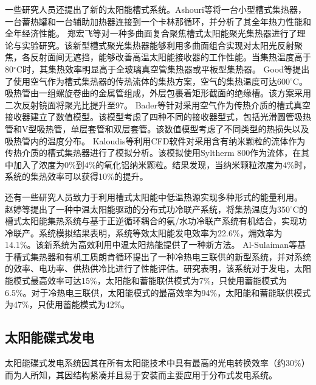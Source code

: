 一些研究人员还提出了新的太阳能槽式系统。Ashouri等\cite{Ashouri2015}将一台小型槽式集热器，一台蓄热罐和一台辅助加热器连接到一个卡林那循环，并分析了其全年热力性能和全年经济性能。
郑宏飞等\cite{Zheng2011}对一种多曲面复合聚焦槽式太阳能聚光集热器进行了理论与实验研究。该新型槽式聚光集热器能够利用多曲面组合实现对太阳光反射聚焦，各反射面间无遮挡，能够改善高温太阳能接收器的工作性能。当集热温度高于80$\mathrm{^\circ C}$时，其集热效率明显高于全玻璃真空管集热器或平板型集热器。
Good等\cite{Good2016}提出了使用空气作为槽式集热器的传热流体的集热方案，空气的集热温度可达600$\mathrm{^\circ C}$。吸热管由一组螺旋卷曲的金属管组成，外层包裹着矩形截面的绝缘槽。该方案采用二次反射镜面将聚光比提升至97。
Bader等\cite{Bader2015}针对采用空气作为传热介质的槽式真空接收器建立了数值模型。该模型考虑了四种不同的接收器型式，包括光滑圆管吸热管和V型吸热管，单层套管和双层套管。该数值模型考虑了不同类型的热损失以及吸热管内的温度分布。
Kaloudis等\cite{Kaloudis2016}利用CFD软件对采用含有纳米颗粒的流体作为传热介质的槽式集热器进行了模拟分析。该模拟使用Syltherm 800作为流体，在其中加入了浓度为0\%到4\%的氧化铝纳米颗粒。结果发现，当纳米颗粒浓度为4\%时，系统的集热效率可以获得10\%的提升。

还有一些研究人员致力于利用槽式太阳能中低温热源实现多种形式的能量利用。
赵婷等\cite{Zhao2013}提出了一种中温太阳能驱动的分布式功冷联产系统，将集热温度为350$\mathrm{^\circ C}$的槽式太阳能集热系统与基于正逆循环耦合的氨/水功冷联产系统有机结合，实现功冷联产。系统模拟结果表明，系统等效太阳能发电效率为22.6\%，㶲效率为14.1\%。该新系统为高效利用中温太阳热能提供了一种新方法。
Al-Sulaiman等\cite{AlSulaiman2012}基于槽式集热器和有机工质朗肯循环提出了一种冷热电三联供的新型系统，并对系统的效率、电功率、供热供冷比进行了性能评估。研究表明，该系统对于发电，太阳能模式最高效率可达15\%，太阳能和蓄能联供模式为7\%，只使用蓄能模式为6.5\%。对于冷热电三联供，太阳能模式的最高效率为94\%，太阳能和蓄能联供模式为47\%，只使用蓄能模式为42\%。

\subsection{太阳能碟式发电}
\label{sec:pd}

太阳能碟式发电系统因其在所有太阳能技术中具有最高的光电转换效率（约30\%）而为人所知，其因结构紧凑并且易于安装而主要应用于分布式发电系统。

